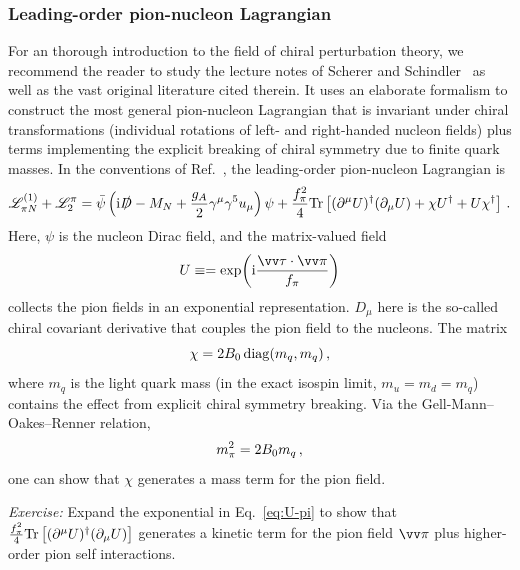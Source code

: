 \subsubsection{Leading-order pion-nucleon Lagrangian}

For an thorough introduction to the field of chiral perturbation theory, we 
recommend the reader to study the lecture notes of Scherer and 
Schindler~\cite{Scherer:2012xha} as well as the vast original literature cited 
therein.  It uses an elaborate formalism to construct the most general 
pion-nucleon Lagrangian that is invariant under chiral transformations 
(individual rotations of left- and right-handed nucleon fields) plus terms 
implementing the explicit breaking of chiral symmetry due to finite quark 
masses.  In the conventions of Ref.~\cite{Scherer:2012xha}, the leading-order 
pion-nucleon Lagrangian is
%
\begin{equation}
 \LL_{\pi N}^{(1)} + \LL_2^\pi
 = \bar{\psi}\left(\ii\slashed{D} - \MN
 +\frac{g_A}{2}\gamma^\mu\gamma^5 u_\mu\right)\psi
 + \frac{\fpi^2}{4}\Tr\left[(\partial^\mu U)^\dagger (\partial_\mu U)
 + \chi U^\dagger + U \chi^\dagger\right] \,.
\label{eq:L-pi-N-chiral}
\end{equation}
%
Here, $\psi$ is the nucleon Dirac field, and the matrix-valued field
%
\begin{equation}
 U \equiv = \exp\!\left(\ii\frac{\skvec{\tau}\cdot\skvec{\pi}}{\fpi}\right)
\label{eq:U-pi}
\end{equation}
%
collects the pion fields in an exponential representation.  $D_\mu$ here is the 
so-called chiral covariant derivative that couples the pion field to the 
nucleons.  The matrix
%
\begin{equation}
 \chi = 2 B_0 \, \mathrm{diag}(m_q,m_q) \,,
\end{equation}
%
where $m_q$ is the light quark mass (in the exact isospin limit, $m_u=m_d=m_q$) 
contains the effect from explicit chiral symmetry breaking.  Via the 
Gell-Mann--Oakes--Renner relation,
%
\begin{equation}
 \mpi^2 = 2B_0 m_q \,,
\label{eq:GMOR}
\end{equation}
%
one can show that $\chi$ generates a mass term for the pion field.

\begin{prob}
\emph{Exercise:} Expand the exponential in Eq.~\eqref{eq:U-pi} to show that 
$\frac{f_\pi^2}{4} \mathrm{Tr}\left[(\partial^\mu U)^\dagger (\partial_\mu U)\right]$ 
generates a kinetic term for the pion field $\skvec{\pi}$ plus higher-order 
pion self interactions.
\end{prob}


